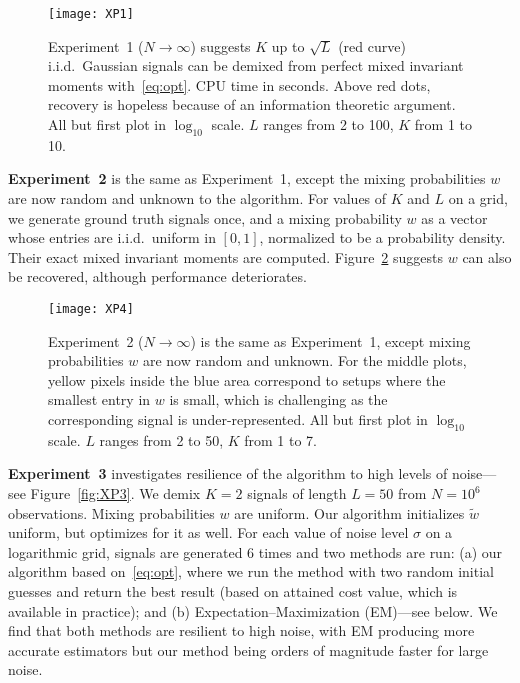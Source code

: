 \documentclass[english]{article}
\numberwithin{equation}{section}
\numberwithin{figure}{section}
\theoremstyle{plain}
\theoremstyle{definition}
\theoremstyle{remark}
\theoremstyle{plain}
\theoremstyle{remark}
\theoremstyle{plain}
\theoremstyle{plain}
\begin{document}
\begin{figure}[t]
	\begin{center}
	\texttt{[image: XP1]}
	\caption{Experiment~1 ($N \to \infty$) suggests $K$ up to $\sqrt{L}$ (red curve) i.i.d.\ Gaussian signals can be demixed from perfect mixed invariant moments with~\eqref{eq:opt}. CPU time in seconds. Above red dots, recovery is hopeless because of an information theoretic argument. All but first plot in $\log_{10}$ scale. $L$ ranges from 2 to 100, $K$ from 1 to 10.}
	\label{fig:XP1}
	\end{center}
\end{figure}

\textbf{Experiment~2} is the same as Experiment~1, except the mixing probabilities $w$ are now random and unknown to the algorithm.
For values of $K$ and $L$ on a grid, we generate ground truth signals once, and a mixing probability $w$ as a vector whose entries are i.i.d.\ uniform in $[0, 1]$, normalized to be a probability density. Their exact mixed invariant moments are computed.
Figure~\ref{fig:XP2} suggests $w$ can also be recovered, although performance deteriorates.

\begin{figure}[t]
	\begin{center}
	\texttt{[image: XP4]}
	\caption{Experiment~2 ($N \to \infty$) is the same as Experiment~1, except mixing probabilities $w$ are now random and unknown.
		For the middle plots, yellow pixels inside the blue area correspond to setups where
		the smallest entry in $w$ is small, which is challenging as the corresponding signal is under-represented.  All but first plot in $\log_{10}$ scale. $L$ ranges from 2 to 50, $K$ from 1 to 7.}
	\label{fig:XP2}
	\end{center}
\end{figure}

\textbf{Experiment~3} investigates resilience of the algorithm to high levels of noise---see Figure~\ref{fig:XP3}. We demix $K = 2$ signals of length $L = 50$ from $N = 10^6$ observations. Mixing probabilities $w$ are uniform. Our algorithm initializes $\tilde w$ uniform, but optimizes for it as well. For each value of noise level $\sigma$ on a logarithmic grid, signals are generated 6 times and two methods are run: (a) our algorithm based on~\eqref{eq:opt}, where we run the method with two random initial guesses and return the best result (based on attained cost value, which is available in practice); and (b) Expectation--Maximization (EM)---see below. We find that both methods are resilient to high noise, with EM producing more accurate estimators but our method being orders of magnitude faster for large noise.  
\end{document}
